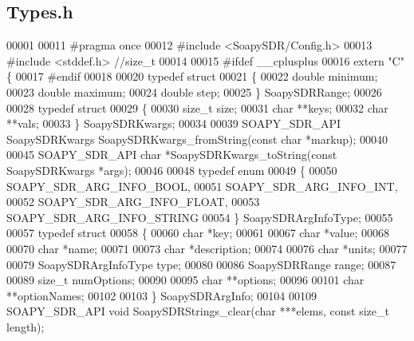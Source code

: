 \subsection{Types.\+h}
\label{Types_8h_source}

\begin{DoxyCode}
00001 
00011 \textcolor{preprocessor}{#pragma once}
00012 \textcolor{preprocessor}{#include <SoapySDR/Config.h>}
00013 \textcolor{preprocessor}{#include <stddef.h>} \textcolor{comment}{//size\_t}
00014 
00015 \textcolor{preprocessor}{#ifdef \_\_cplusplus}
00016 \textcolor{keyword}{extern} \textcolor{stringliteral}{"C"} \{
00017 \textcolor{preprocessor}{#endif}
00018 
00020 \textcolor{keyword}{typedef} \textcolor{keyword}{struct}
00021 \{
00022     \textcolor{keywordtype}{double} minimum;
00023     \textcolor{keywordtype}{double} maximum;
00024     \textcolor{keywordtype}{double} step;
00025 \} SoapySDRRange;
00026 
00028 \textcolor{keyword}{typedef} \textcolor{keyword}{struct}
00029 \{
00030     \textcolor{keywordtype}{size\_t} size;
00031     \textcolor{keywordtype}{char} **keys;
00032     \textcolor{keywordtype}{char} **vals;
00033 \} SoapySDRKwargs;
00034 
00039 SOAPY_SDR_API SoapySDRKwargs SoapySDRKwargs_fromString(\textcolor{keyword}{const} \textcolor{keywordtype}{char} *markup);
00040 
00045 SOAPY_SDR_API \textcolor{keywordtype}{char} *SoapySDRKwargs_toString(\textcolor{keyword}{const} SoapySDRKwargs *args);
00046 
00048 \textcolor{keyword}{typedef} \textcolor{keyword}{enum}
00049 \{
00050     SOAPY_SDR_ARG_INFO_BOOL,
00051     SOAPY_SDR_ARG_INFO_INT,
00052     SOAPY_SDR_ARG_INFO_FLOAT,
00053     SOAPY_SDR_ARG_INFO_STRING
00054 \} SoapySDRArgInfoType;
00055 
00057 \textcolor{keyword}{typedef} \textcolor{keyword}{struct}
00058 \{
00060     \textcolor{keywordtype}{char} *key;
00061 
00067     \textcolor{keywordtype}{char} *value;
00068 
00070     \textcolor{keywordtype}{char} *name;
00071 
00073     \textcolor{keywordtype}{char} *description;
00074 
00076     \textcolor{keywordtype}{char} *units;
00077 
00079     SoapySDRArgInfoType type;
00080 
00086     SoapySDRRange range;
00087 
00089     \textcolor{keywordtype}{size\_t} numOptions;
00090 
00095     \textcolor{keywordtype}{char} **options;
00096 
00101     \textcolor{keywordtype}{char} **optionNames;
00102 
00103 \} SoapySDRArgInfo;
00104 
00109 SOAPY_SDR_API \textcolor{keywordtype}{void} SoapySDRStrings_clear(\textcolor{keywordtype}{char} ***elems, \textcolor{keyword}{const} \textcolor{keywordtype}{size\_t} length);

\end{DoxyCode}
